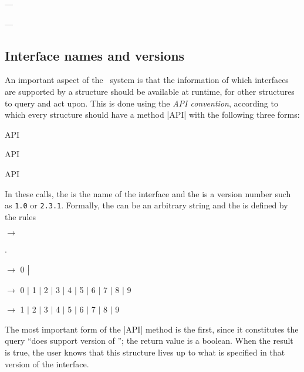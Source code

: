\documentclass{mtmtcl}
\theoremstyle{plain}
\theoremstyle{remark}
\begin{document}
---



% 


---


\subsection{Interface names and versions}
\label{Ssec:InterfaceVersion}

An important aspect of the \mtl\ system is that the information of 
which interfaces are supported by a structure should be available at 
runtime, for other structures to query and act upon. This is done 
using the \emph{API convention}, according to which every structure 
should have a method |API| with the following three forms:
\begin{displaysyntax}
   API  \par
   API \par
   API
\end{displaysyntax}
In these calls, the  is the name of the interface and 
the  is a version number such as \texttt{1.0} or 
\texttt{2.3.1}. Formally, the  can be an arbitrary 
string and the  is defined by the rules
\begin{displaysyntax}
   $\longrightarrow$ \relax
    \begin{regblock}[\regstar] . \end{regblock}
    \par
   $\longrightarrow$ 0 $\bigm\vert$ 
    \regstar\par
   $\longrightarrow$ 0 $\vert$ 1 $\vert$ 2 $\vert$ 3 
    $\vert$ 4 $\vert$ 5 $\vert$ 6 $\vert$ 7 $\vert$ 8 $\vert$ 9\par
   $\longrightarrow$ 1 $\vert$ 2 $\vert$ 3 
    $\vert$ 4 $\vert$ 5 $\vert$ 6 $\vert$ 7 $\vert$ 8 $\vert$ 9
\end{displaysyntax}
The most important form of the |API| method is the first, since it 
constitutes the query ``does  support version 
 of ''; the return value is a boolean. 
When the result is true, the user knows that this structure lives up 
to what is specified in that version of the interface.
\end{document}

